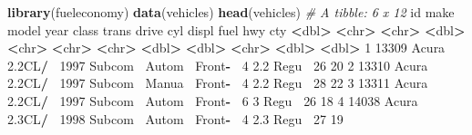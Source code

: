 \documentclass[
]{book}
\newenvironment{Shaded}{\begin{snugshade}}{\end{snugshade}}
\newcommand{\CommentTok}[1]{\textcolor[rgb]{0.56,0.35,0.01}{\textit{#1}}}
\newcommand{\DecValTok}[1]{\textcolor[rgb]{0.00,0.00,0.81}{#1}}
\newcommand{\ErrorTok}[1]{\textcolor[rgb]{0.64,0.00,0.00}{\textbf{#1}}}
\newcommand{\FloatTok}[1]{\textcolor[rgb]{0.00,0.00,0.81}{#1}}
\newcommand{\KeywordTok}[1]{\textcolor[rgb]{0.13,0.29,0.53}{\textbf{#1}}}
\newcommand{\NormalTok}[1]{#1}
\newcommand{\OperatorTok}[1]{\textcolor[rgb]{0.81,0.36,0.00}{\textbf{#1}}}
\newcommand{\StringTok}[1]{\textcolor[rgb]{0.31,0.60,0.02}{#1}}
\begin{document}
\begin{Shaded}
\begin{Highlighting}[]
\KeywordTok{library}\NormalTok{(fueleconomy)}
\KeywordTok{data}\NormalTok{(vehicles)}
\KeywordTok{head}\NormalTok{(vehicles)}
\CommentTok{# A tibble: 6 x 12}
\NormalTok{     id make  model    year class   trans  drive     cyl displ fuel    hwy   cty}
  \OperatorTok{<}\NormalTok{dbl}\OperatorTok{>}\StringTok{ }\ErrorTok{<}\NormalTok{chr}\OperatorTok{>}\StringTok{ }\ErrorTok{<}\NormalTok{chr}\OperatorTok{>}\StringTok{   }\ErrorTok{<}\NormalTok{dbl}\OperatorTok{>}\StringTok{ }\ErrorTok{<}\NormalTok{chr}\OperatorTok{>}\StringTok{   }\ErrorTok{<}\NormalTok{chr}\OperatorTok{>}\StringTok{  }\ErrorTok{<}\NormalTok{chr}\OperatorTok{>}\StringTok{   }\ErrorTok{<}\NormalTok{dbl}\OperatorTok{>}\StringTok{ }\ErrorTok{<}\NormalTok{dbl}\OperatorTok{>}\StringTok{ }\ErrorTok{<}\NormalTok{chr}\OperatorTok{>}\StringTok{ }\ErrorTok{<}\NormalTok{dbl}\OperatorTok{>}\StringTok{ }\ErrorTok{<}\NormalTok{dbl}\OperatorTok{>}
\DecValTok{1} \DecValTok{13309}\NormalTok{ Acura }\FloatTok{2.2}\NormalTok{CL}\OperatorTok{/}\ErrorTok{~}\StringTok{  }\DecValTok{1997}\NormalTok{ Subcom}\OperatorTok{~}\StringTok{ }\NormalTok{Autom}\OperatorTok{~}\StringTok{ }\NormalTok{Front}\OperatorTok{-}\ErrorTok{~}\StringTok{     }\DecValTok{4}   \FloatTok{2.2}\NormalTok{ Regu}\OperatorTok{~}\StringTok{    }\DecValTok{26}    \DecValTok{20}
\DecValTok{2} \DecValTok{13310}\NormalTok{ Acura }\FloatTok{2.2}\NormalTok{CL}\OperatorTok{/}\ErrorTok{~}\StringTok{  }\DecValTok{1997}\NormalTok{ Subcom}\OperatorTok{~}\StringTok{ }\NormalTok{Manua}\OperatorTok{~}\StringTok{ }\NormalTok{Front}\OperatorTok{-}\ErrorTok{~}\StringTok{     }\DecValTok{4}   \FloatTok{2.2}\NormalTok{ Regu}\OperatorTok{~}\StringTok{    }\DecValTok{28}    \DecValTok{22}
\DecValTok{3} \DecValTok{13311}\NormalTok{ Acura }\FloatTok{2.2}\NormalTok{CL}\OperatorTok{/}\ErrorTok{~}\StringTok{  }\DecValTok{1997}\NormalTok{ Subcom}\OperatorTok{~}\StringTok{ }\NormalTok{Autom}\OperatorTok{~}\StringTok{ }\NormalTok{Front}\OperatorTok{-}\ErrorTok{~}\StringTok{     }\DecValTok{6}   \DecValTok{3}\NormalTok{   Regu}\OperatorTok{~}\StringTok{    }\DecValTok{26}    \DecValTok{18}
\DecValTok{4} \DecValTok{14038}\NormalTok{ Acura }\FloatTok{2.3}\NormalTok{CL}\OperatorTok{/}\ErrorTok{~}\StringTok{  }\DecValTok{1998}\NormalTok{ Subcom}\OperatorTok{~}\StringTok{ }\NormalTok{Autom}\OperatorTok{~}\StringTok{ }\NormalTok{Front}\OperatorTok{-}\ErrorTok{~}\StringTok{     }\DecValTok{4}   \FloatTok{2.3}\NormalTok{ Regu}\OperatorTok{~}\StringTok{    }\DecValTok{27}    \DecValTok{19}

\end{Highlighting}
\end{Shaded}
\end{document}
